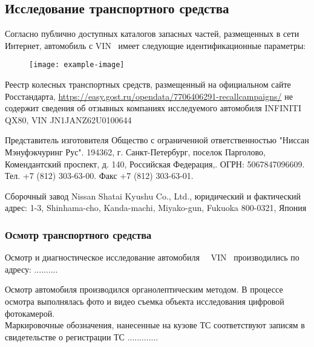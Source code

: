 \subsection*{Исследование транспортного средства}

Согласно публично доступных  каталогов запасных частей, размещенных в сети Интернет,  автомобиль с VIN \vin \ имеет следующие идентификационные параметры:
\begin{figure}[H]
	\centering
	\texttt{[image: example-image]}
\end{figure}


Реестр колесных транспортных средств, размещенный на официальном сайте Росстандарта, \url{https://easy.gost.ru/opendata/7706406291-recallcampaigns/} не содержит сведения об отзывных компаниях исследуемого автомобиля INFINITI QX80, VIN JN1JANZ62U0100644



Представитель изготовителя	Общество с ограниченной ответственностью "Ниссан Мэнуфэкчуринг Рус". 194362, г. Санкт-Петербург, поселок Парголово, Комендантский проспект, д. 140, Российская Федерация,. ОГРН: 5067847096609. Тел. +7 (812) 303-63-00. Факс +7 (812) 303-63-01. 

Сборочный завод	Nissan Shatai Kyushu Co., Ltd., юридический и фактический адрес: 1-3, Shinhama-cho, Kanda-machi, Miyako-gun, Fukuoka 800-0321, Япония




\subsubsection{Осмотр транспортного средства}

Осмотр и диагностическое исследование  автомобиля  \, \, VIN \vin \, производились по адресу: ..........

Осмотр автомобиля производился  органолептическим методом. В процессе осмотра выполнялась фото и видео съемка объекта исследования цифровой фотокамерой.\\ 
Маркировочные обозначения, нанесенные на кузове ТС соответствуют записям  в свидетельстве о регистрации ТС  .............




